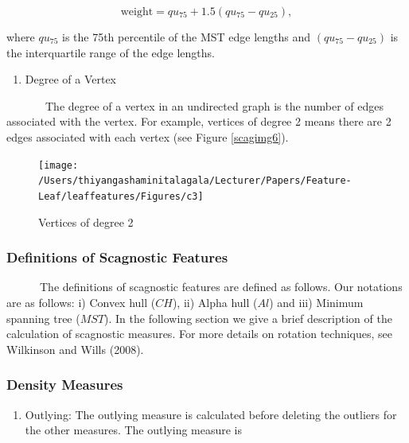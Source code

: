 \documentclass{article}
\begin{document}
\begin{equation}
    \text{weight} = qu_{75} + 1.5(qu_{75} - qu_{25}),
    \label{w1}
\end{equation}

where \(qu_{75}\) is the 75th percentile of the MST edge lengths and
\((qu_{75} - qu_{25})\) is the interquartile range of the edge lengths.

\begin{enumerate}
\def\labelenumi{\roman{enumi})}
\setcounter{enumi}{2}
\tightlist
\item
  Degree of a Vertex
\end{enumerate}

~~~~~~~The degree of a vertex in an undirected graph is the number of
edges associated with the vertex. For example, vertices of degree 2
means there are 2 edges associated with each vertex (see Figure
\ref{scagimg6}).

\begin{figure}[!ht]

{\centering \texttt{[image: /Users/thiyangashaminitalagala/Lecturer/Papers/Feature-Leaf/leaffeatures/Figures/c3]} 

}

\caption{\label{scagimg6}Vertices of degree 2}\label{fig:unnamed-chunk-33}
\end{figure}

\hypertarget{definitions-of-scagnostic-features}{%
\subsubsection{Definitions of Scagnostic
Features}\label{definitions-of-scagnostic-features}}

~~~~~~The definitions of scagnostic features are defined as follows. Our
notations are as follows: i) Convex hull (\(CH\)), ii) Alpha hull
(\(Al\)) and iii) Minimum spanning tree (\(MST\)). In the following
section we give a brief description of the calculation of scagnostic
measures. For more details on rotation techniques, see Wilkinson and
Wills (2008).

\hypertarget{density-measures}{%
\subsubsection{Density Measures}\label{density-measures}}

\begin{enumerate}
\def\labelenumi{\roman{enumi})}
\tightlist
\item
  Outlying: The outlying measure is calculated before deleting the
  outliers for the other measures. The outlying measure is
\end{enumerate}
\end{document}

